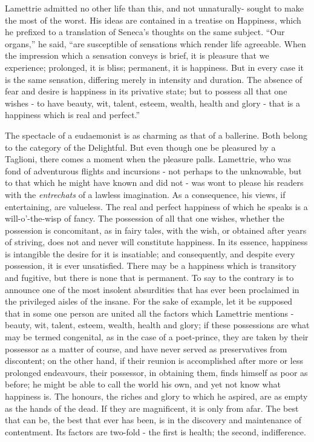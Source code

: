 \documentclass[]{book}
\begin{document}
Lamettrie admitted no other life than this, and not unnaturally- sought
to make the most of the worst. His ideas are contained in a treatise on
Happiness, which he prefixed to a translation of Seneca's thoughts on
the same subject. ``Our organs,'' he said, ``are susceptible of
sensations which render life agreeable. When the impression which a
sensation conveys is brief, it is pleasure that we experience;
prolonged, it is bliss; permanent, it is happiness. But in every case it
is the same sensation, differing merely in intensity and duration. The
absence of fear and desire is happiness in its privative state; but to
possess all that one wishes - to have beauty, wit, talent, esteem,
wealth, health and glory - that is a happiness which is real and
perfect.''

The spectacle of a eudaemonist is as charming as that of a ballerine.
Both belong to the category of the Delightful. But even though one be
pleasured by a Taglioni, there comes a moment when the pleasure palls.
Lamettrie, who was fond of adventurous flights and incursions - not
perhaps to the unknowable, but to that which he might have known and did
not - was wont to please his readers with the \emph{entrechats} of a
lawless imagination. As a consequence, his views, if entertaining, are
valueless. The real and perfect happiness of which he speaks is a
will-o'-the-wisp of fancy. The possession of all that one wishes,
whether the possession is concomitant, as in fairy tales, with the wish,
or obtained after years of striving, does not and never will constitute
happiness. In its essence, happiness is intangible the desire for it is
insatiable; and consequently, and despite every possession, it is ever
unsatisfied. There may be a happiness which is transitory and fugitive,
but there is none that is permanent. To say to the contrary is to
announce one of the most insolent absurdities that has ever been
proclaimed in the privileged aisles of the insane. For the sake of
example, let it be supposed that in some one person are united all the
factors which Lamettrie mentions - beauty, wit, talent, esteem, wealth,
health and glory; if these possessions are what may be termed
congenital, as in the case of a poet-prince, they are taken by their
possessor as a matter of course, and have never served as preservatives
from discontent; on the other hand, if their reunion is accomplished
after more or less prolonged endeavours, their possessor, in obtaining
them, finds himself as poor as before; he might be able to call the
world his own, and yet not know what happiness is. The honours, the
riches and glory to which he aspired, are as empty as the hands of the
dead. If they are magnificent, it is only from afar. The best that can
be, the best that ever has been, is in the discovery and maintenance of
contentment. Its factors are two-fold - the first is health; the second,
indifference.
\end{document}
